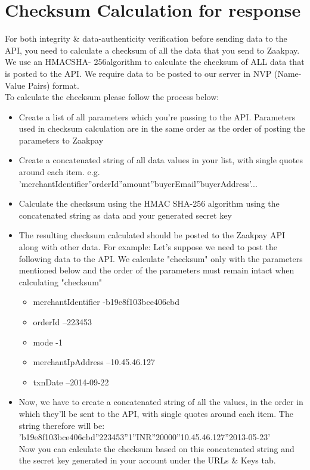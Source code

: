 \documentclass{article}
\begin{document}
\section{Checksum Calculation for response}
For both integrity \& data-authenticity verification before sending data to the API, you need to calculate a checksum of all the data that you send to Zaakpay. We use an HMACSHA- 256algorithm to calculate the checksum of ALL data that is posted to the API. We require data to be posted to our server in NVP (Name- Value Pairs) format. \\
To calculate the checksum please follow the process below:
\begin{itemize}
\item Create a list of all parameters which you’re passing to the API. Parameters used in checksum calculation are in the same order as the order of posting the parameters to Zaakpay
\item Create a concatenated string of all data values in your list, with single quotes around each item. e.g.
'merchantIdentifier''orderId''amount''buyerEmail''buyerAddress'...
\item Calculate the checksum using the HMAC SHA-256 algorithm using the concatenated string as data
and your generated secret key
\item The resulting checksum calculated should be posted to the Zaakpay API along with other data. For
example: Let’s suppose we need to post the following data to the API. We calculate "checksum" only with the parameters mentioned below and the order of the parameters must remain intact when calculating "checksum"
\begin{itemize}
\item merchantIdentifier -b19e8f103bce406cbd
\item orderId –223453
\item mode -1
\item merchantIpAddress –10.45.46.127
\item txnDate –2014-09-22
\end{itemize}
\item Now, we have to create a concatenated string of all the values, in the order in which they’ll be sent to the API, with single quotes around each item. The string therefore will be: \\
'b19e8f103bce406cbd''223453''1''INR''20000''10.45.46.127''2013-05-23'\\
Now you can calculate the checksum based on this concatenated string and the secret key generated in your account under the URLs \& Keys tab.
\end{itemize} \newpage
\end{document}
